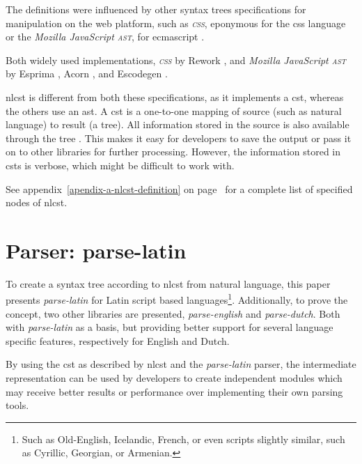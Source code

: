 The definitions were influenced by other syntax trees specifications for
  manipulation on the web platform, such as \emph{\textsc{css}}, eponymous
  for the \acrshort{css} language \autocite{reworkcss/css-source-code} or the
  \emph{Mozilla JavaScript \textsc{ast}}, for \gls{ecmascript}
  \autocite{mozilla.org-spidermonkey-parser_api}.

Both widely used implementations, \emph{\textsc{css}} by Rework
  \autocite{reworkcss/rework-source-code}, and \emph{Mozilla JavaScript
  \textsc{ast}} by Esprima \autocite{ariya/esprima-source-code}, Acorn
  \autocite{marijnh/acorn-source-code}, and Escodegen
  \autocite{constellation/escodegen-source-code}.

\gls{nlcst} is different from both these specifications, as it implements a
  \gls{cst}, whereas the others use an \gls{ast}.
A \gls{cst} is a one-to-one mapping of source (such as natural language)
  to result (a tree).
All information stored in the source is also available through the tree
  \autocite{thegreenplace.net-abstract-concrete-syntax-trees}.
This makes it easy for developers to save the output or pass it on to other
  libraries for further processing.
However, the information stored in \glspl{cst} is verbose, which might be
  difficult to work with.

\medskip \noindent See appendix~\ref{apendix-a-nlcst-definition} on
page~\pageref{apendix-a-nlcst-definition} for a complete list of
specified nodes of \gls{nlcst}.

\section{Parser: parse-latin}\label{parser-parse-latin}

To create a syntax tree according to \gls{nlcst} from natural language,
  this paper presents \emph{parse-latin} for Latin script based
  languages\footnote{Such
    as Old-English, Icelandic, French, or even scripts slightly similar, such
    as Cyrillic, Georgian, or Armenian.}.
Additionally, to prove the concept, two other libraries are presented,
  \emph{parse-english} and \emph{parse-dutch}. Both with \emph{parse-latin}
  as a basis, but providing better support for several language specific
  features, respectively for English and Dutch.

By using the \gls{cst} as described by \gls{nlcst} and the \emph{parse-latin}
  parser, the intermediate representation can be used by developers to
  create independent modules which may receive better results or
  performance over implementing their own parsing tools.


